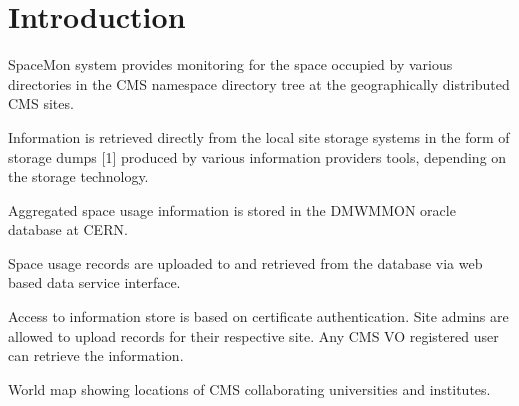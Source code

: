 \section{Introduction}

SpaceMon system provides monitoring for the space occupied by various 
directories in the CMS namespace directory tree at the geographically 
distributed CMS sites.

Information is retrieved directly from the local site storage 
systems in the form of storage dumps [1] produced by various information 
providers tools, depending on the storage technology.


Aggregated space usage information is stored in the DMWMMON oracle 
database at CERN.


Space usage records are uploaded to and retrieved from the database 
via web based data service interface.


Access to information store is based on certificate authentication. 
Site admins are allowed to upload records for their respective site. Any 
CMS VO registered user can retrieve the information.

World map showing locations of CMS collaborating universities and institutes.
